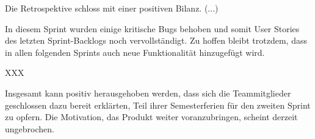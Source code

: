 \nsecend%

Die Retrospektive schloss mit einer positiven Bilanz. (...)
\nsecend%

In diesem Sprint wurden einige kritische Bugs behoben und somit User Stories des letzten Sprint-Backlogs noch vervollständigt. Zu hoffen bleibt trotzdem, dass in allen folgenden Sprints auch neue Funktionalität hinzugefügt wird.
\nsecend%

XXX
\nsecend%

Insgesamt kann positiv herausgehoben werden, dass sich die Teammitglieder geschlossen dazu bereit erklärten, Teil ihrer Semesterferien für den zweiten Sprint zu opfern. Die Motivation, das Produkt weiter voranzubringen, scheint derzeit ungebrochen.
\nsecend%